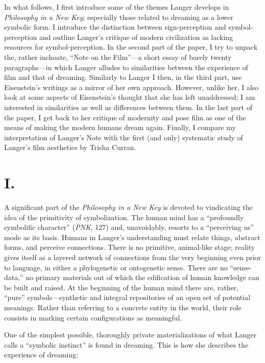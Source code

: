 \documentclass{tufte-handout}
\begin{document}
In what follows, I first introduce some of the themes Langer develops in
\emph{Philosophy in a New Key}; especially those related to dreaming as
a lower symbolic form. I introduce the distinction between
sign-perception and symbol-perception and outline Langer's critique of
modern civilization as lacking resources for symbol-perception. In the
second part of the paper, I try to unpack the, rather inchoate, ``Note
on the Film''---a short essay of barely twenty paragraphs---in which
Langer alludes to similarities between the experience of film and that
of dreaming. Similarly to Langer I then, in the third part, use
Eisenstein's writings as a mirror of her own approach. However, unlike
her, I also look at some aspects of Eisenstein's thought that she has
left unaddressed; I am interested in similarities as well as differences
between them. In the last part of the paper, I get back to her critique
of modernity and pose film as one of the means of making the modern
humans dream again. Finally, I compare my interpretation of Langer's
Note with the first (and only) systematic study of Langer's film
aesthetics by Trisha Curran.

\hypertarget{i}{%
\section{I.}\label{i}}

A significant part of the \emph{Philosophy in a New Key} is devoted to
vindicating the idea of the primitivity of symbolization. The human mind
has a ``profoundly symbolific character'' (\emph{PNK}, 127) and,
unavoidably, resorts to a ``perceiving as'' mode as its basis. Humans in
Langer's understanding must relate things, abstract forms, and perceive
connections. There is no primitive, animal-like stage; reality gives
itself as a layered network of connections from the very beginning even
prior to language, in either a phylogenetic or ontogenetic sense. There
are no ``sense-data,'' no primary materials out of which the edification
of human knowledge can be built and raised. At the beginning of the
human mind there are, rather, ``pure'' symbols---synthetic and integral
repositories of an open set of potential meanings. Rather than referring
to a concrete entity in the world, their role consists in marking
certain configurations as meaningful.

One of the simplest possible, thoroughly private materializations of
what Langer calls a ``symbolic instinct'' is found in dreaming. This is
how she describes the experience of dreaming:
\end{document}
